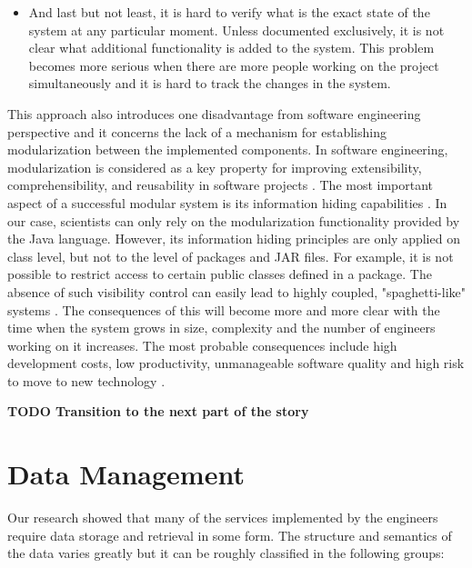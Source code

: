 \begin{itemize}
	\item And last but not least, it is hard to verify what is the exact state of the system at any particular moment. Unless documented exclusively, it is not clear what additional functionality is added to the system. This problem becomes more serious when there are more people working on the project simultaneously and it is hard to track the changes in the system.
		
\end{itemize}

This approach also introduces one disadvantage from software engineering perspective and it concerns the lack of a mechanism for establishing modularization between the implemented components. In software engineering, modularization is considered as a key property for improving extensibility, comprehensibility, and reusability in software projects \cite{Parnas}. The most important aspect of a successful modular system is its information hiding capabilities \cite{Srivastava}. In our case, scientists can only rely on the modularization functionality provided by the Java language. However, its information hiding principles are only applied on class level, but not to the level of packages and JAR files. For example, it is not possible to restrict access to certain public classes defined in a package. The absence of such visibility control can easily lead to highly coupled, "spaghetti-like" systems \cite{Eder}. The consequences of this will become more and more clear with the time when the system grows in size, complexity and the number of engineers working on it increases. The most probable consequences include high development costs, low productivity, unmanageable software quality and high risk to move to new technology \cite{Cai}.

\textbf{TODO Transition to the next part of the story}

\section{Data Management}
\label{sec:problemDefStorage}

Our research showed that many of the services implemented by the engineers require data storage and retrieval in some form. The structure and semantics of the data varies greatly but it can be roughly classified in the following groups:

